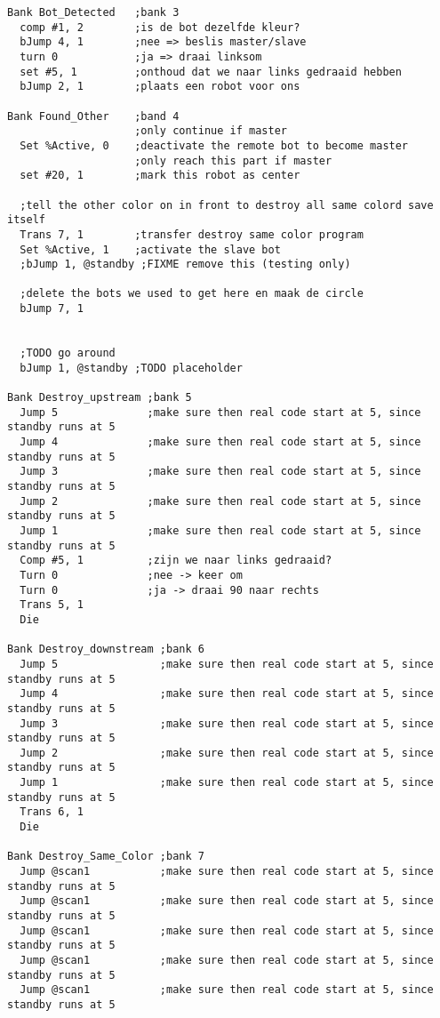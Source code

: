 \documentclass[10pt]{article}
\begin{document}
\begin{verbatim}
Bank Bot_Detected   ;bank 3
  comp #1, 2        ;is de bot dezelfde kleur?
  bJump 4, 1        ;nee => beslis master/slave
  turn 0            ;ja => draai linksom
  set #5, 1         ;onthoud dat we naar links gedraaid hebben
  bJump 2, 1        ;plaats een robot voor ons
  
Bank Found_Other    ;band 4
                    ;only continue if master
  Set %Active, 0    ;deactivate the remote bot to become master
                    ;only reach this part if master
  set #20, 1        ;mark this robot as center
  
  ;tell the other color on in front to destroy all same colord save itself
  Trans 7, 1        ;transfer destroy same color program
  Set %Active, 1    ;activate the slave bot
  ;bJump 1, @standby ;FIXME remove this (testing only)
  
  ;delete the bots we used to get here en maak de circle
  bJump 7, 1
     
  
  ;TODO go around
  bJump 1, @standby ;TODO placeholder

Bank Destroy_upstream ;bank 5
  Jump 5              ;make sure then real code start at 5, since standby runs at 5
  Jump 4              ;make sure then real code start at 5, since standby runs at 5
  Jump 3              ;make sure then real code start at 5, since standby runs at 5
  Jump 2              ;make sure then real code start at 5, since standby runs at 5
  Jump 1              ;make sure then real code start at 5, since standby runs at 5
  Comp #5, 1          ;zijn we naar links gedraaid?
  Turn 0              ;nee -> keer om
  Turn 0              ;ja -> draai 90 naar rechts
  Trans 5, 1
  Die

Bank Destroy_downstream ;bank 6
  Jump 5                ;make sure then real code start at 5, since standby runs at 5
  Jump 4                ;make sure then real code start at 5, since standby runs at 5
  Jump 3                ;make sure then real code start at 5, since standby runs at 5
  Jump 2                ;make sure then real code start at 5, since standby runs at 5
  Jump 1                ;make sure then real code start at 5, since standby runs at 5
  Trans 6, 1
  Die
  
Bank Destroy_Same_Color ;bank 7
  Jump @scan1           ;make sure then real code start at 5, since standby runs at 5
  Jump @scan1           ;make sure then real code start at 5, since standby runs at 5
  Jump @scan1           ;make sure then real code start at 5, since standby runs at 5
  Jump @scan1           ;make sure then real code start at 5, since standby runs at 5
  Jump @scan1           ;make sure then real code start at 5, since standby runs at 5
  

\end{verbatim}
\end{document}
